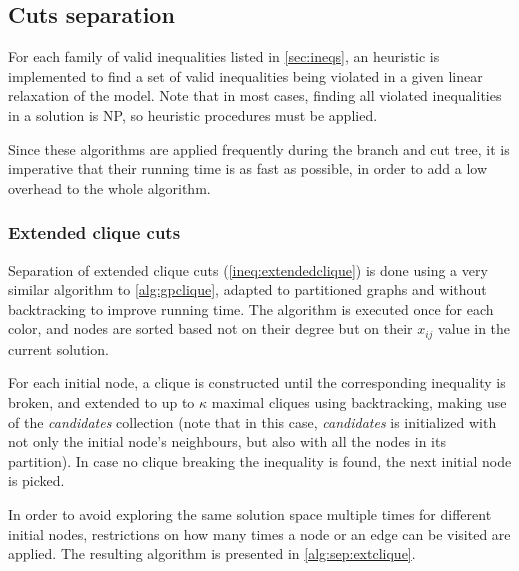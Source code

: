\subsection{Cuts separation}

For each family of valid inequalities listed in \ref{sec:ineqs}, an heuristic is implemented to find a set of valid inequalities being violated in a given linear relaxation of the model. Note that in most cases, finding all violated inequalities in a solution is NP, so heuristic procedures must be applied. 

Since these algorithms are applied frequently during the branch and cut tree, it is imperative that their running time is as fast as possible, in order to add a low overhead to the whole algorithm.

\subsubsection*{Extended clique cuts}

Separation of extended clique cuts (\ref{ineq:extendedclique}) is done using a very similar algorithm to \ref{alg:gpclique}, adapted to partitioned graphs and without backtracking to improve running time. The algorithm is executed once for each color, and nodes are sorted based not on their degree but on their $x_{ij}$ value in the current solution.

For each initial node, a clique is constructed until the corresponding inequality is broken, and extended to up to $\kappa$ maximal cliques using backtracking, making use of the \textit{candidates} collection (note that in this case, \textit{candidates} is initialized with not only the initial node's neighbours, but also with all the nodes in its partition). In case no clique breaking the inequality is found, the next initial node is picked.

In order to avoid exploring the same solution space multiple times for different initial nodes, restrictions on how many times a node or an edge can be visited are applied. The resulting algorithm is presented in \ref{alg:sep:extclique}.

